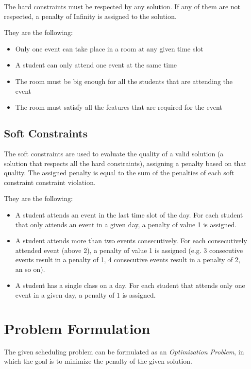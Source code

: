 \documentclass[conference]{IEEEtran}
\begin{document}
The hard constraints must be respected by any solution. If any of them are not respected, a penalty of Infinity is assigned to the solution.

They are the following:

\begin{itemize}
    \item Only one event can take place in a room at any given time slot
    \item A student can only attend one event at the same time
    \item The room must be big enough for all the students that are attending the event
    \item The room must satisfy all the features that are required for the event
\end{itemize}

\subsection{Soft Constraints}

The soft constraints are used to evaluate the quality of a valid solution (a solution that respects all the hard constraints), assigning a penalty based on that quality. The assigned penalty is equal to the sum of the penalties of each soft constraint constraint violation.

They are the following: 

\begin{itemize}
    \item A student attends an event in the last time slot of the day. For each student that only attends an event in a given day, a penalty of value 1 is assigned.
    \item A student attends more than two events consecutively. For each consecutively attended event (above 2), a penalty of value 1 is assigned (e.g. 3 consecutive events result in a penalty of 1, 4 consecutive events result in a penalty of 2, an so on). 
    \item A student has a single class on a day. For each student that attends only one event in a given day, a penalty of 1 is assigned.
\end{itemize}

\section{Problem Formulation}

The given scheduling problem can be formulated as an \textit{Optimization Problem}, in which the goal is to minimize the penalty of the given solution.
\end{document}
